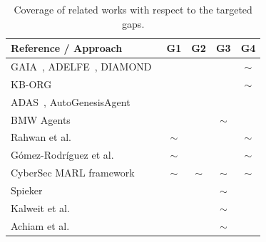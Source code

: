 \documentclass[pdflatex,sn-mathphys-num]{sn-jnl}%
\newcommand{\cmark}{\ding{51}}%
\newcommand{\xmark}{\ding{55}}%
\theoremstyle{thmstyleone}%
\theoremstyle{thmstyletwo}%
\theoremstyle{thmstylethree}%
\begin{document}
\begin{table}[h!]
    \centering
    \caption{Coverage of related works with respect to the targeted gaps.}
    \label{tab:related_works}
    \begin{tabular}{p{7.5cm}cccc}
        \toprule
        \textbf{Reference / Approach}                                                                                              & \textbf{G1} & \textbf{G2} & \textbf{G3} & \textbf{G4} \\
        \midrule
        GAIA~\cite{gaia1998}, ADELFE~\cite{adelfe2002}, DIAMOND~\cite{Jamont2005}                                                  & \xmark      & \xmark      & \xmark      & $\sim$      \\
        KB-ORG~\cite{Sims2008}                                                                                                     & \xmark      & \xmark      & \xmark      & $\sim$      \\
        ADAS~\cite{smith2024automated}, AutoGenesisAgent~\cite{harper2024autogenesisagent}                                         & \xmark      & \xmark      & \xmark      & \cmark      \\
        BMW Agents~\cite{crawford2024bmw}                                                                                          & \xmark      & \xmark      & $\sim$      & \cmark      \\
        Rahwan et al.~\cite{rahwan2006integrating}                                                                                 & $\sim$      & \xmark      & \xmark      & $\sim$      \\
        Gómez-Rodríguez et al.~\cite{gomez2011modeling}                                                                            & $\sim$      & \xmark      & \xmark      & $\sim$      \\
        CyberSec MARL framework~\cite{hammar2023scalable}                                                                          & $\sim$      & $\sim$      & $\sim$      & $\sim$      \\
        Spieker~\cite{spieker2021constraint}                                                                                       & \xmark      & \cmark      & $\sim$      & \xmark      \\
        Kalweit et al.~\cite{kalweit2020deep}                                                                                      & \xmark      & \cmark      & $\sim$      & \xmark      \\
        Achiam et al.~\cite{achiam2017constrained}                                                                                 & \xmark      & \cmark      & $\sim$      & \xmark      \\

\end{tabular}
\end{table}
\end{document}
